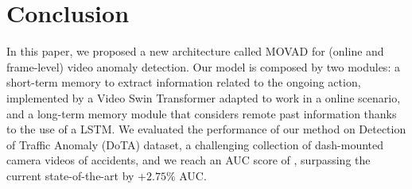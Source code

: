 \section{Conclusion}
\label{sec:conclusions}

In this paper, we proposed a new architecture called MOVAD for (online and frame-level) video anomaly detection.
Our model is composed by two modules: a short-term memory to extract information related to the ongoing action, implemented by a Video Swin Transformer adapted to work in a online scenario, and a long-term memory module that considers remote past information thanks to the use of a LSTM.
We evaluated the performance of our method on Detection of Traffic Anomaly (DoTA) dataset, a challenging collection of dash-mounted camera videos of accidents, and we reach an AUC score of , surpassing the current state-of-the-art by $+2.75\%$ AUC.
